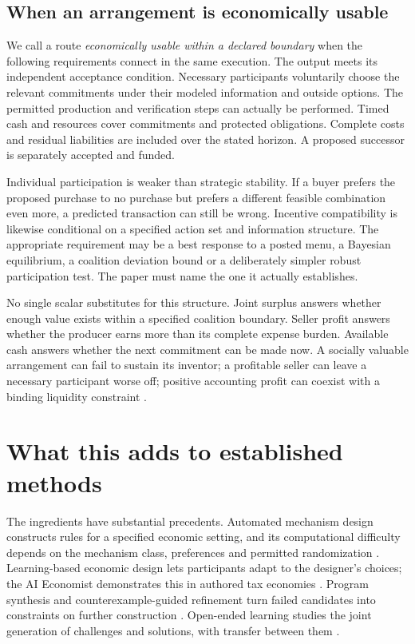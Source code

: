 \subsection{When an arrangement is economically usable}
We call a route \emph{economically usable within a declared boundary} when the following requirements connect in the same execution. The output meets its independent acceptance condition. Necessary participants voluntarily choose the relevant commitments under their modeled information and outside options. The permitted production and verification steps can actually be performed. Timed cash and resources cover commitments and protected obligations. Complete costs and residual liabilities are included over the stated horizon. A proposed successor is separately accepted and funded.

Individual participation is weaker than strategic stability. If a buyer prefers the proposed purchase to no purchase but prefers a different feasible combination even more, a predicted transaction can still be wrong. Incentive compatibility is likewise conditional on a specified action set and information structure. The appropriate requirement may be a best response to a posted menu, a Bayesian equilibrium, a coalition deviation bound or a deliberately simpler robust participation test. The paper must name the one it actually establishes.

No single scalar substitutes for this structure. Joint surplus answers whether enough value exists within a specified coalition boundary. Seller profit answers whether the producer earns more than its complete expense burden. Available cash answers whether the next commitment can be made now. A socially valuable arrangement can fail to sustain its inventor; a profitable seller can leave a necessary participant worse off; positive accounting profit can coexist with a binding liquidity constraint \cite{economy,superalpha}.

\section{What this adds to established methods}\label{sec:related}
The ingredients have substantial precedents. Automated mechanism design constructs rules for a specified economic setting, and its computational difficulty depends on the mechanism class, preferences and permitted randomization \cite{conitzer2002,conitzer2003}. Learning-based economic design lets participants adapt to the designer's choices; the AI Economist demonstrates this in authored tax economies \cite{aieconomist}. Program synthesis and counterexample-guided refinement turn failed candidates into constraints on further construction \cite{cegis}. Open-ended learning studies the joint generation of challenges and solutions, with transfer between them \cite{poet}.

